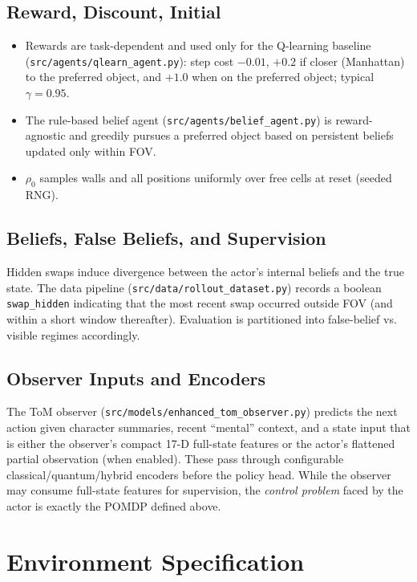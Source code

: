 \documentclass[11pt]{article}
\begin{document}
\subsection{Reward, Discount, Initial}
\begin{itemize}
  \item Rewards are task-dependent and used only for the Q-learning baseline (\texttt{src/agents/qlearn\_agent.py}): step cost \(-0.01\), \(+0.2\) if closer (Manhattan) to the preferred object, and \(+1.0\) when on the preferred object; typical \(\gamma=0.95\).
  \item The rule-based belief agent (\texttt{src/agents/belief\_agent.py}) is reward-agnostic and greedily pursues a preferred object based on persistent beliefs updated only within FOV.
  \item \(\rho_0\) samples walls and all positions uniformly over free cells at reset (seeded RNG).
\end{itemize}

\subsection{Beliefs, False Beliefs, and Supervision}
Hidden swaps induce divergence between the actor's internal beliefs and the true state. The data pipeline (\texttt{src/data/rollout\_dataset.py}) records a boolean \texttt{swap\_hidden} indicating that the most recent swap occurred outside FOV (and within a short window thereafter). Evaluation is partitioned into false-belief vs. visible regimes accordingly.

\subsection{Observer Inputs and Encoders}
The ToM observer (\texttt{src/models/enhanced\_tom\_observer.py}) predicts the next action given character summaries, recent ``mental'' context, and a state input that is either the observer's compact 17-D full-state features or the actor's flattened partial observation (when enabled). These pass through configurable classical/quantum/hybrid encoders before the policy head. While the observer may consume full-state features for supervision, the \emph{control problem} faced by the actor is exactly the POMDP defined above.

\section{Environment Specification}
\end{document}
